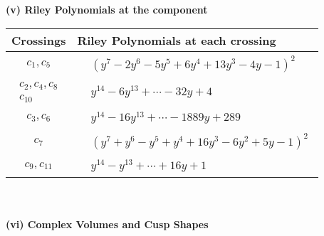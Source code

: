 \documentclass[1p]{elsarticle_modified}
\theoremstyle{definition}
\begin{document}
\flushleft \textbf{(v) Riley Polynomials at the component}\newline \\
\begin{tabular}{m{50pt}|m{274pt}}
Crossings & \hspace{64pt}Riley Polynomials at each crossing \\
\hline $$\begin{aligned}c_{1},c_{5}\end{aligned}$$&$\begin{aligned}
&(y^7-2 y^6-5 y^5+6 y^4+13 y^3-4 y-1)^2
\end{aligned}$\\
\hline $$\begin{aligned}c_{2},c_{4},c_{8}\\c_{10}\end{aligned}$$&$\begin{aligned}
&y^{14}-6 y^{13}+\cdots-32 y+4
\end{aligned}$\\
\hline $$\begin{aligned}c_{3},c_{6}\end{aligned}$$&$\begin{aligned}
&y^{14}-16 y^{13}+\cdots-1889 y+289
\end{aligned}$\\
\hline $$\begin{aligned}c_{7}\end{aligned}$$&$\begin{aligned}
&(y^7+y^6- y^5+y^4+16 y^3-6 y^2+5 y-1)^2
\end{aligned}$\\
\hline $$\begin{aligned}c_{9},c_{11}\end{aligned}$$&$\begin{aligned}
&y^{14}- y^{13}+\cdots+16 y+1
\end{aligned}$\\
\hline
\end{tabular}\\~\\
\newpage\flushleft \textbf{(vi) Complex Volumes and Cusp Shapes}
\end{document}
